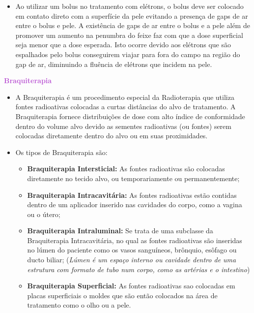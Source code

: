 \documentclass[11pt,a4paper]{article}
\newcounter{exemplo}
\begin{document}
\begin{exemplo}
\begin{itemize}
        \item Ao utilizar um bolus no tratamento com elétrons, o bolus deve ser colocado em contato direto com a  superfície da pele evitando a presença de gaps de ar entre o bolus e pele. A existência de gaps de ar entre o bolus e a pele além de promover um aumento na penumbra do feixe faz com que a dose superficial seja menor que a dose esperada. Isto ocorre devido aos elétrons que são espalhados pelo bolus conseguirem viajar para fora do campo na região do gap de ar, diminuindo a fluência de elétrons que incidem na pele.

    \end{itemize}
\end{exemplo}

\begin{exemplo}[Braquiterapia]
    \textcolor{MediumOrchid}{\LobsterTwo\textbf{Braquiterapia}}
    \begin{itemize}
        \item A Braquiterapia é um procedimento especial da Radioterapia que utiliza fontes radioativas colocadas a curtas distâncias do alvo de tratamento. A Braquiterapia fornece distribuições de dose com alto índice de conformidade dentro do volume alvo devido as sementes radioativas (ou fontes) serem colocadas diretamente dentro do alvo ou em suas proximidades.
        
        \item Os tipos de Braquiterapia são:
        
            \begin{itemize}[label=\textcolor{CarnationPink}{\textopenbullet}]
                \item \textcolor{CarnationPink}{\textbf{Braquiterapia Intersticial:}} As fontes radioativas são colocadas diretamente no tecido alvo, ou temporariamente ou permanentemente;
                \item \textcolor{CarnationPink}{\textbf{Braquiterapia Intracavitária:}} As fontes radioativas estão contidas dentro de um aplicador inserido nas cavidades do corpo, como a vagina ou o útero;
                \item \textcolor{CarnationPink}{\textbf{Braquiterapia Intraluminal:}} Se trata de uma subclasse da Braquiterapia Intracavitária, no qual as fontes radioativas são inseridas no lúmen do paciente como os vasos sanguíneos, brônquio, esôfago ou ducto biliar; (\textit{Lúmen é um espaço interno ou cavidade dentro de uma estrutura com formato de tubo num corpo, como as artérias e o intestino})
                \item \textcolor{CarnationPink}{\textbf{Braquiterapia Superficial:}} As fontes radioativas sao colocadas em placas superficiais o moldes que são então colocados na área de tratamento como o olho ou a pele. 
            \end{itemize}


\end{itemize}
\end{exemplo}
\end{document}

